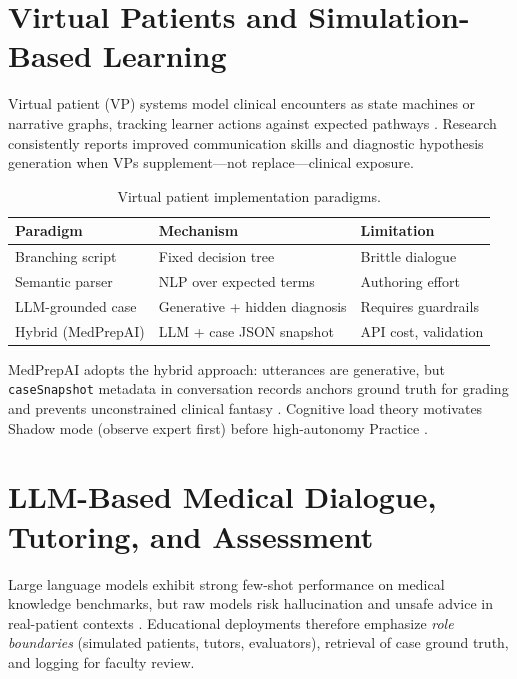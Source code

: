 \section{Virtual Patients and Simulation-Based Learning}
Virtual patient (VP) systems model clinical encounters as state machines or narrative graphs, tracking learner actions against expected pathways \cite{cook_vp_2005,linkesch_virtual_2020}. Research consistently reports improved communication skills and diagnostic hypothesis generation when VPs supplement---not replace---clinical exposure.

\begin{table}[htbp]
  \centering
  \caption{Virtual patient implementation paradigms.}
  \label{tab:vp-paradigms}
  \small
  \begin{tabular}{@{}p{3.2cm}p{5.2cm}p{4.8cm}@{}}
    \toprule
    \textbf{Paradigm} & \textbf{Mechanism} & \textbf{Limitation} \\
    \midrule
    Branching script & Fixed decision tree & Brittle dialogue \\
    Semantic parser & NLP over expected terms & Authoring effort \\
    LLM-grounded case & Generative + hidden diagnosis & Requires guardrails \\
    Hybrid (MedPrepAI) & LLM + case JSON snapshot & API cost, validation \\
    \bottomrule
  \end{tabular}
\end{table}

MedPrepAI adopts the hybrid approach: utterances are generative, but \texttt{caseSnapshot} metadata in conversation records anchors ground truth for grading and prevents unconstrained clinical fantasy \cite{van_melle_fyp_2000}. Cognitive load theory motivates Shadow mode (observe expert first) before high-autonomy Practice \cite{sweller_cognitive_1988}.

\section{LLM-Based Medical Dialogue, Tutoring, and Assessment}
Large language models exhibit strong few-shot performance on medical knowledge benchmarks, but raw models risk hallucination and unsafe advice in real-patient contexts \cite{singhal_medpalm_2023}. Educational deployments therefore emphasize \emph{role boundaries} (simulated patients, tutors, evaluators), retrieval of case ground truth, and logging for faculty review.

